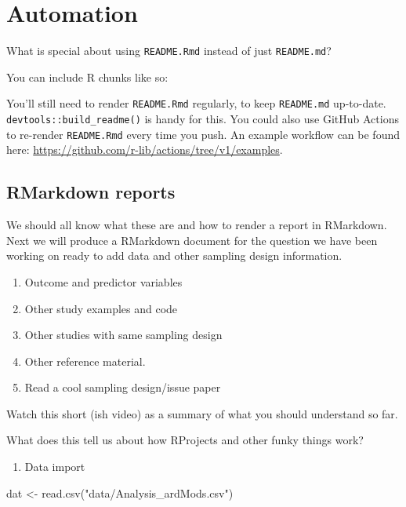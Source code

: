 \documentclass[
]{book}
\newenvironment{Shaded}{\begin{snugshade}}{\end{snugshade}}
\newcommand{\FunctionTok}[1]{\textcolor[rgb]{0.00,0.00,0.00}{#1}}
\newcommand{\NormalTok}[1]{#1}
\newcommand{\OtherTok}[1]{\textcolor[rgb]{0.56,0.35,0.01}{#1}}
\newcommand{\StringTok}[1]{\textcolor[rgb]{0.31,0.60,0.02}{#1}}
\providecommand{\tightlist}{%
  \setlength{\itemsep}{0pt}\setlength{\parskip}{0pt}}
\begin{document}
\hypertarget{automation}{%
\chapter{Automation}\label{automation}}

What is special about using \texttt{README.Rmd} instead of just \texttt{README.md}?

You can include R chunks like so:

You'll still need to render \texttt{README.Rmd} regularly, to keep \texttt{README.md} up-to-date. \texttt{devtools::build\_readme()} is handy for this. You could also use GitHub Actions to re-render \texttt{README.Rmd} every time you push. An example workflow can be found here: \url{https://github.com/r-lib/actions/tree/v1/examples}.

\hypertarget{rmarkdown-reports-1}{%
\section{RMarkdown reports}\label{rmarkdown-reports-1}}

We should all know what these are and how to render a report in RMarkdown. Next we will produce a RMarkdown document for the question we have been working on ready to add data and other sampling design information.

\begin{enumerate}
\def\labelenumi{\arabic{enumi}.}
\tightlist
\item
  Outcome and predictor variables
\item
  Other study examples and code
\item
  Other studies with same sampling design
\item
  Other reference material.
\item
  Read a cool sampling design/issue paper
\end{enumerate}

Watch this short (ish video) as a summary of what you should understand so far.

What does this tell us about how RProjects and other funky things work?

\begin{enumerate}
\def\labelenumi{\arabic{enumi}.}
\setcounter{enumi}{2}
\tightlist
\item
  Data import
\end{enumerate}

\begin{Shaded}
\begin{Highlighting}[]
\NormalTok{dat }\OtherTok{\textless{}{-}} \FunctionTok{read.csv}\NormalTok{(}\StringTok{"data/Analysis\_ardMods.csv"}\NormalTok{)}
\end{Highlighting}
\end{Shaded}
\end{document}

